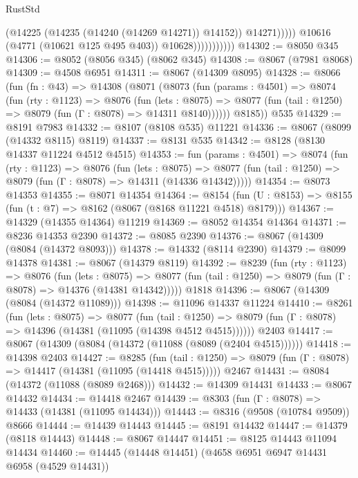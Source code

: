 \begin{lexlean}{RustStd}
\begin{coremodule}
                                    (@14225 (@14235 (@14240 (@14269 @14271)) @14152))
                                    @14271)))))
                          @10616
                          (@4771 (@10621 @125 @495 @403))
                          @10628)))))))))))
@14302 := @8050 @345
@14306 := @8052 (@8056 @345) (@8062 @345)
@14308 := @8067 (@7981 @8068)
@14309 := @4508 @6951
@14311 := @8067 (@14309 @8095)
@14328 := @8066
    (fun (fn : @43) =>
    @14308
      (@8071
        (@8073
          (fun (params : @4501) =>
          @8074
            (fun (rty : @1123) =>
            @8076
              (fun (lets : @8075) =>
              @8077 (fun (tail : @1250) => @8079 (fun (Γ : @8078) => @14311 @8140))))))
        @8185))
    @535
@14329 := @8191 @7983
@14332 := @8107 (@8108 @535) @11221
@14336 := @8067 (@8099 (@14332 @8115) @8119)
@14337 := @8131 @535
@14342 := @8128 (@8130 @14337 @11224 @4512 @4515)
@14353 := fun (params : @4501) =>
  @8074
    (fun (rty : @1123) =>
    @8076
      (fun (lets : @8075) =>
      @8077 (fun (tail : @1250) => @8079 (fun (Γ : @8078) => @14311 (@14336 @14342)))))
@14354 := @8073 @14353
@14355 := @8071 @14354
@14364 := @8154
    (fun (U : @8153) => @8155 (fun (t : @7) => @8162 (@8067 (@8168 @11221 @4518) @8179)))
@14367 := @14329 (@14355 @14364) @11219
@14369 := @8052 @14354 @14364
@14371 := @8236 @14353 @2390
@14372 := @8085 @2390
@14376 := @8067 (@14309 (@8084 (@14372 @8093)))
@14378 := @14332 (@8114 @2390)
@14379 := @8099 @14378
@14381 := @8067 (@14379 @8119)
@14392 := @8239
    (fun (rty : @1123) =>
    @8076
      (fun (lets : @8075) =>
      @8077 (fun (tail : @1250) => @8079 (fun (Γ : @8078) => @14376 (@14381 @14342)))))
    @1818
@14396 := @8067 (@14309 (@8084 (@14372 @11089)))
@14398 := @11096 @14337 @11224
@14410 := @8261
    (fun (lets : @8075) =>
    @8077
      (fun (tail : @1250) =>
      @8079 (fun (Γ : @8078) => @14396 (@14381 (@11095 (@14398 @4512 @4515))))))
    @2403
@14417 := @8067 (@14309 (@8084 (@14372 (@11088 (@8089 (@2404 @4515))))))
@14418 := @14398 @2403
@14427 := @8285
    (fun (tail : @1250) => @8079 (fun (Γ : @8078) => @14417 (@14381 (@11095 (@14418 @4515)))))
    @2467
@14431 := @8084 (@14372 (@11088 (@8089 @2468)))
@14432 := @14309 @14431
@14433 := @8067 @14432
@14434 := @14418 @2467
@14439 := @8303 (fun (Γ : @8078) => @14433 (@14381 (@11095 @14434)))
@14443 := @8316 (@9508 (@10784 @9509)) @8666
@14444 := @14439 @14443
@14445 := @8191 @14432
@14447 := @14379 (@8118 @14443)
@14448 := @8067 @14447
@14451 := @8125 @14443 @11094 @14434
@14460 := @14445 (@14448 @14451) (@4658 @6951 @6947 @14431 @6958 (@4529 @14431))

\end{coremodule}
\end{lexlean}
